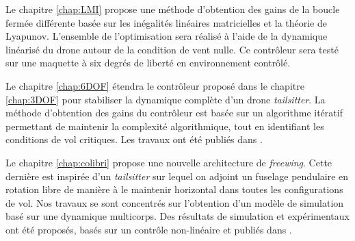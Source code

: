 Le chapitre \ref{chap:LMI} propose une méthode d'obtention des gains de la boucle fermée différente basée sur les inégalités linéaires matricielles et la théorie de Lyapunov. L'ensemble de l'optimisation sera réalisé à l'aide de la dynamique linéarisé du drone autour de la condition de vent nulle. Ce contrôleur sera testé sur une maquette à six degrés de liberté en environnement contrôlé.

Le chapitre \ref{chap:6DOF} étendra le contrôleur proposé dans le chapitre \ref{chap:3DOF} pour stabiliser la dynamique complète d'un drone \textit{tailsitter}. La méthode d'obtention des gains du contrôleur est basée sur un algorithme itératif permettant de maintenir la complexité algorithmique, tout en identifiant les conditions de vol critiques. Les travaux ont été publiés dans \cite{sansouTCST}.

Le chapitre \ref{chap:colibri} propose une nouvelle architecture de \textit{freewing}. Cette dernière est inspirée d'un \textit{tailsitter} sur lequel on adjoint un fuselage pendulaire en rotation libre de manière à le maintenir horizontal dans toutes les configurations de vol. Nos travaux se sont concentrés sur l'obtention d'un modèle de simulation basé sur une dynamique multicorps. Des résultats de simulation et expérimentaux ont été proposés, basés sur un contrôle non-linéaire et publiés dans \cite{sansouICUAS}.




